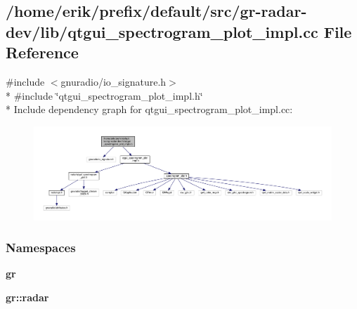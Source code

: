 \subsection{/home/erik/prefix/default/src/gr-\/radar-\/dev/lib/qtgui\+\_\+spectrogram\+\_\+plot\+\_\+impl.cc File Reference}
\label{qtgui__spectrogram__plot__impl_8cc}
{\ttfamily \#include $<$gnuradio/io\+\_\+signature.\+h$>$}\\*
{\ttfamily \#include \char`\"{}qtgui\+\_\+spectrogram\+\_\+plot\+\_\+impl.\+h\char`\"{}}\\*
Include dependency graph for qtgui\+\_\+spectrogram\+\_\+plot\+\_\+impl.\+cc\+:
\nopagebreak
\begin{figure}[H]
\begin{center}
\leavevmode
\includegraphics[width=350pt]{d6/dea/qtgui__spectrogram__plot__impl_8cc__incl}
\end{center}
\end{figure}
\subsubsection*{Namespaces}
\begin{DoxyCompactItemize}
\item 
 {\bf gr}
\item 
 {\bf gr\+::radar}
\end{DoxyCompactItemize}

